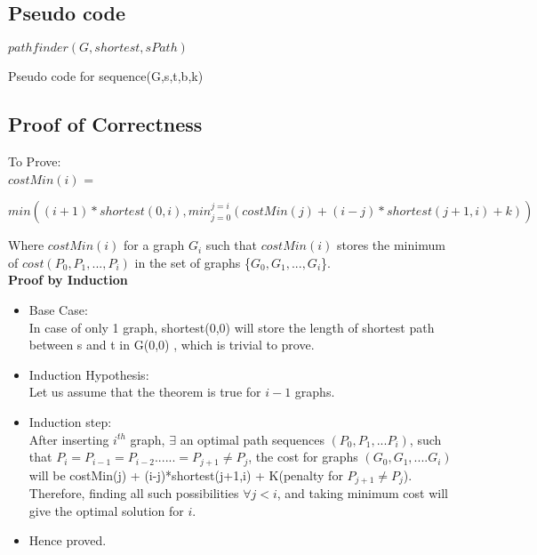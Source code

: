 \documentclass[pdftex,a4paper,12pt]{report}
\begin{document}
\subsection{Pseudo code}
\begin{algorithm}
$pathfinder(G,shortest,sPath)$
\caption{Pseudo code for sequence(G,s,t,b,k)}
\end{algorithm}


\subsection{Proof of Correctness}
To Prove:\\
$costMin(i)$ = 
\begin{center}
$min((i+1)*shortest(0,i),min_{j=0}^{j=i}(costMin(j)+(i-j)*shortest(j+1,i)+k))$
\end{center}
Where $costMin(i)$ for a graph $G_i$ such that $costMin(i)$ stores the minimum of $cost(P_0,P_1,...,P_i)$ in the set of graphs \{$G_0,G_1,...,G_i$\}.\\
\textbf{Proof by Induction}\\
\begin{itemize}
\item Base Case:\\
In case of only 1 graph, shortest(0,0) will store the length of shortest path between s and t in G(0,0) , which is trivial to prove.
\item Induction Hypothesis:\\
Let us assume that the theorem is true for $i-1$ graphs.
\item Induction step:\\
After inserting $i^{th}$ graph, $\exists$ an optimal path sequences $(P_0,P_1,...P_i)$, such that $P_i = P_{i-1} = P_{i-2}......= P_{j+1} \neq P_{j}$, the cost for graphs $(G_0,G_1,....G_i)$ will be costMin(j) + (i-j)*shortest(j+1,i) + K(penalty for $P_{j+1} \neq P_{j}$). Therefore, finding all such possibilities $\forall j < i$, and taking minimum cost will give the optimal solution for $i$.
\item Hence proved.
\end{itemize}
\end{document}
